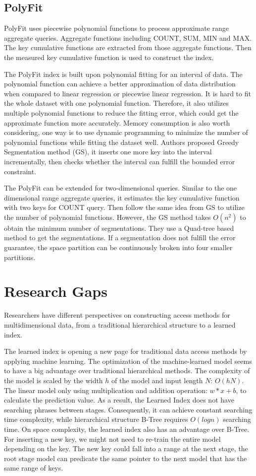 \subsection{PolyFit}
PolyFit \cite{li2020polyfit} uses piecewise polynomial functions to process approximate range aggregate queries. Aggregate functions including COUNT, SUM, MIN and MAX. The key cumulative functions are extracted from those aggregate functions. Then the measured key cumulative function is used to construct the index. 

The PolyFit index is built upon polynomial fitting for an interval of data. The polynomial function can achieve a better approximation of data distribution when compared to linear regression or piecewise linear regression. It is hard to fit the whole dataset with one polynomial function. Therefore, it also utilizes multiple polynomial functions to reduce the fitting error, which could get the approximate function more accurately. Memory consumption is also worth considering, one way is to use dynamic programming to minimize the number of polynomial functions while fitting the dataset well. Authors proposed Greedy Segmentation method (GS), it inserts one more key into the interval incrementally, then checks whether the interval can fulfill the bounded error constraint. 

The PolyFit can be extended for two-dimensional queries. Similar to the one dimensional range aggregate queries, it estimates the key cumulative function with two keys for COUNT query. Then follow the same idea from GS to utilize the number of polynomial functions. However, the GS method takes $O(n^2)$ to obtain the minimum number of segmentations. They use a Quad-tree based method to get the segmentations. If a segmentation does not fulfill the error guarantee, the space partition can be continuously broken into four smaller partitions. 



\section{Research Gaps}
Researchers have different perspectives on constructing access methods for multidimensional data, from a traditional hierarchical structure to a learned index. 

The learned index is opening a new page for traditional data access methods by applying machine learning. The optimization of the machine-learned model seems to have a big advantage over traditional hierarchical methods. The complexity of the model is scaled by the width $h$ of the model and input length $N$: $O(hN)$. The linear model only using multiplication and addition operation: $w*x+b$, to calculate the prediction value. As a result, the Learned Index does not have searching phrases between stages. Consequently, it can achieve constant searching time complexity, while hierarchical structure B-Tree requires $O(logn)$ searching time. On space complexity, the learned index also has an advantage over B-Tree. For inserting a new key, we might not need to re-train the entire model depending on the key. The new key could fall into a range at the next stage, the root stage model can predicate the same pointer to the next model that has the same range of keys. 

